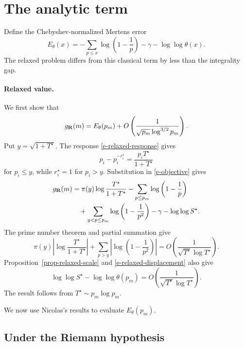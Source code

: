 \section{The analytic term}
\label{s-relaxed-excess}

Define the Chebyshev-normalized Mertens error
\begin{equation}
\label{e-mertens-error}
    E_\theta(x)
    =
    -\sum_{p\leq x}\log\left(1-\frac1p\right)
    -\gamma-\log\log\theta(x).
\end{equation}
The relaxed problem differs from this classical term by less than the
integrality gap.

\paragraph{Relaxed value.}
We first show that
\begin{equation}
\label{e-relaxed-value}
    g_{\mathbf{R}}(m)
    =
    E_\theta(p_m)
    +
    O\left(
        \frac1{\sqrt{p_m}\log^{3/2}p_m}
    \right).
\end{equation}
Put \(y=\sqrt{1+T^\star}\). The response
\eqref{e-relaxed-response} gives
\[
    p_i-p_i^{-r_i^\star}
    =
    \frac{p_iT^\star}{1+T^\star}
\]
for \(p_i\leq y\), while \(r_i^\star=1\) for \(p_i>y\).
Substitution in \eqref{e-objective} gives
\[
\begin{aligned}
    g_{\mathbf{R}}(m)
    &=
    \pi(y)\log\frac{T^\star}{1+T^\star}
    -\sum_{p\leq p_m}\log\left(1-\frac1p\right)\\
    &\quad
    +\sum_{y<p\leq p_m}\log\left(1-\frac1{p^2}\right)
    -\gamma-\log\log S^\star.
\end{aligned}
\]
The prime number theorem and partial summation give
\[
    \pi(y)\left|\log\frac{T^\star}{1+T^\star}\right|
    +
    \sum_{p>y}\left|\log\left(1-\frac1{p^2}\right)\right|
    =
    O\left(\frac1{\sqrt{T^\star}\log T^\star}\right).
\]
Proposition~\ref{prop-relaxed-scale} and
\eqref{e-relaxed-displacement} also give
\[
    \log\log S^\star-\log\log\theta(p_m)
    =
    O\left(\frac1{\sqrt{T^\star}\log T^\star}\right).
\]
The result follows from \(T^\star\sim p_m\log p_m\).

We now use Nicolas's results to evaluate \(E_\theta(p_m)\).

\subsection{Under the Riemann hypothesis}
\label{s-rh-branch}

